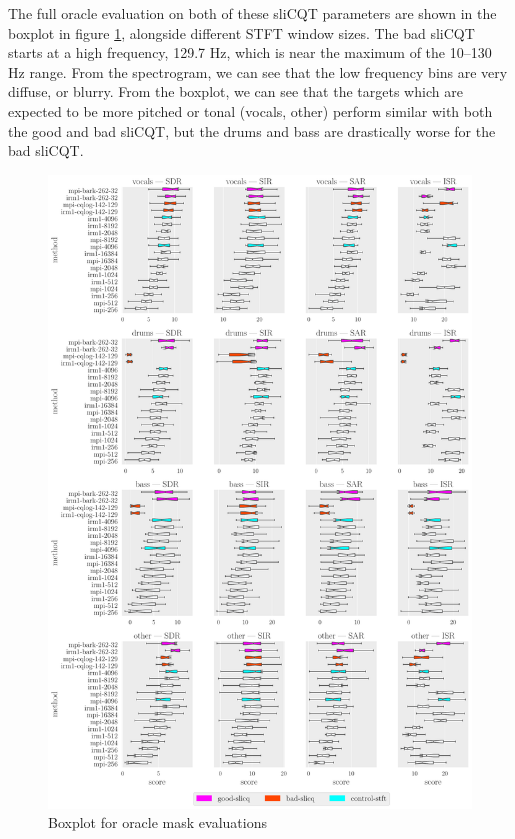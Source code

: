 \documentclass[report.tex]{subfiles}
\begin{document}
The full oracle evaluation on both of these sliCQT parameters are shown in the boxplot in figure \ref{fig:oraclebssboxplot}, alongside different STFT window sizes. The bad sliCQT starts at a high frequency, 129.7 Hz, which is near the maximum of the 10--130 Hz range. From the spectrogram, we can see that the low frequency bins are very diffuse, or blurry. From the boxplot, we can see that the targets which are expected to be more pitched or tonal (vocals, other) perform similar with both the good and bad sliCQT, but the drums and bass are drastically worse for the bad sliCQT.

\begin{figure}[H]
	\centering
	\includegraphics[width=\textwidth]{./images-bss/oracle_boxplot.pdf}
	\caption{Boxplot for oracle mask evaluations}
	\label{fig:oraclebssboxplot}
\end{figure}
\end{document}
